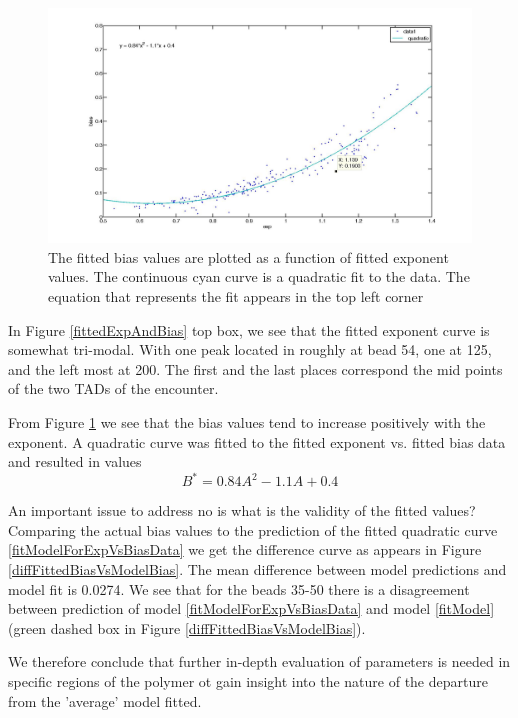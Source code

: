 \documentclass[12pt]{book}
\begin{document}
\begin{figure}[H]
\includegraphics[scale=0.15]{fittedExpVsFittedBias}
\caption{\scriptsize{The fitted bias values are plotted as a function of fitted exponent values. The continuous cyan curve is a quadratic fit to the data. The equation that represents the fit appears in the top left corner}}
\label{fittedExpVsFittedBias}
\end{figure}

In Figure \ref{fittedExpAndBias} top box, we see that the fitted exponent curve is somewhat tri-modal. With one peak located in roughly at bead 54, one at 125, and the left most at 200. The first and the last places correspond the mid points of the two TADs of the encounter. 

From Figure \ref{fittedExpVsFittedBias} we see that the bias values tend to increase positively with the exponent. A quadratic curve was fitted to the fitted exponent vs. fitted bias data and resulted in values
\begin{equation}\label{fitModelForExpVsBiasData}
B^* = 0.84A^2-1.1A+0.4
\end{equation}

 An important issue to address no is what is the validity of the fitted values?
Comparing the actual bias values to the prediction of the fitted quadratic curve \ref{fitModelForExpVsBiasData} we get the difference curve as appears in Figure \ref{diffFittedBiasVsModelBias}. The mean difference between model predictions and model fit is 0.0274. We see that for the beads 35-50 there is a disagreement between prediction of model \ref{fitModelForExpVsBiasData} and model \ref{fitModel} (green dashed box in Figure \ref{diffFittedBiasVsModelBias}). 

We therefore conclude that further in-depth evaluation of parameters is needed in specific regions of the polymer ot gain insight into the nature of the departure from the 'average' model fitted.
\end{document}
